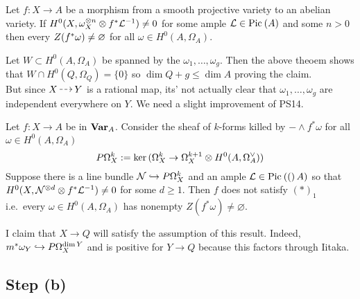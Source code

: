 \documentclass[12pt]{article}
\begin{document}
\begin{theorem}[PS '14]
Let $f : X \to A$ be a morphism from a smooth projective variety to an abelian variety. If $H^0(X, \omega_X^{\otimes n} \otimes f^* \mathcal{L}^{-1} ) \neq 0$ for some ample $\mathcal{L} \in \mathrm{Pic}^{} \left( A \right)$ and some $n > 0$ then every $Z(f^* \omega) \neq \varnothing$ for all $\omega \in H^0(A, \Omega_A)$.
\end{theorem}

Let $W \subset H^0(A, \Omega_A)$ be spanned by the $\omega_1, \dots, \omega_g$. Then the above theoem shows that $W \cap H^0(Q, \Omega_Q) = \{ 0 \}$ so $\dim{Q} + g \le \dim{A}$ proving the claim.
\bigskip\\
But since $X \rat Y$ is a rational map, its' not actually clear that $\omega_1, \dots, \omega_g$ are independent everywhere on $Y$. We need a slight improvement of PS14.

\newcommand{\cN}{\mathcal{N}}

\begin{theorem} \label{thm:generalization_of_PS14}
Let $f : X \to A$ be in $\mathbf{Var}_A$. Consider the sheaf of $k$-forms killed by $-\wedge f^* \omega$ for all $\omega \in H^0(A, \Omega_A)$
\[ P\Omega_X^k := \ker{(\Omega_X^k \to \Omega_X^{k+1} \otimes H^0(A, \Omega_A^{\vee}))}  \]
Suppose there is a line bundle $\cN \embed P\Omega_X^k$ and an ample $\mathcal{L} \in \mathrm{Pic}^{} \left( ( \right)A)$ so that $H^0(X, \cN^{\ot d} \ot f^* \L^{-1}) \neq 0$ for some $d \ge 1$. Then $f$ does not satisfy $(\ast)_1$ i.e.\ every $\omega \in H^0(A, \Omega_A)$ has nonempty $Z(f^* \omega) \neq \varnothing$.
\end{theorem}

I claim that $X \to Q$ will satisfy the assumption of this result. Indeed, $m^* \omega_Y \hookrightarrow P \Omega^{\dim{Y}}_X$ and is positive for $Y \to Q$ because this factors through Iitaka. 


\subsection{Step (b)}
\end{document}
